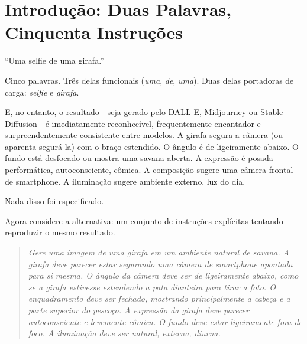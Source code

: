 \documentclass[12pt,a4paper]{article}
\begin{document}
\begin{abstract}
\medskip
\noindent\textbf{Palavras-chave:} Densidade Semiótica (\textit{Semiotic Density}), Escrita Ideográfica, Injeção de Framework (\textit{Framework Injection}), Cadeia de Densidade (\textit{Chain of Density}), Mesclagem Conceitual (\textit{Conceptual Blending}), Densidade Informacional Uniforme (\textit{Uniform Information Density}), Prompt Engineering, Interação Humano-IA
\end{abstract}

\newpage
\tableofcontents
\newpage

\section{Introdução: Duas Palavras, Cinquenta Instruções}
\label{sec:introduction}

``Uma selfie de uma girafa.''

Cinco palavras.
Três delas funcionais (\textit{uma}, \textit{de}, \textit{uma}).
Duas delas portadoras de carga: \textit{selfie} e \textit{girafa}.

E, no entanto, o resultado---seja gerado pelo DALL-E, Midjourney ou Stable Diffusion---é imediatamente reconhecível, frequentemente encantador e surpreendentemente consistente entre modelos.
A girafa segura a câmera (ou aparenta segurá-la) com o braço estendido.
O ângulo é de ligeiramente abaixo.
O fundo está desfocado ou mostra uma savana aberta.
A expressão é posada---performática, autoconsciente, cômica.
A composição sugere uma câmera frontal de smartphone.
A iluminação sugere ambiente externo, luz do dia.

Nada disso foi especificado.

Agora considere a alternativa: um conjunto de instruções explícitas tentando reproduzir o mesmo resultado.

\begin{quote}
\textit{Gere uma imagem de uma girafa em um ambiente natural de savana. A girafa deve parecer estar segurando uma câmera de smartphone apontada para si mesma. O ângulo da câmera deve ser de ligeiramente abaixo, como se a girafa estivesse estendendo a pata dianteira para tirar a foto. O enquadramento deve ser fechado, mostrando principalmente a cabeça e a parte superior do pescoço. A expressão da girafa deve parecer autoconsciente e levemente cômica. O fundo deve estar ligeiramente fora de foco. A iluminação deve ser natural, externa, diurna.}
\end{quote}
\end{document}
